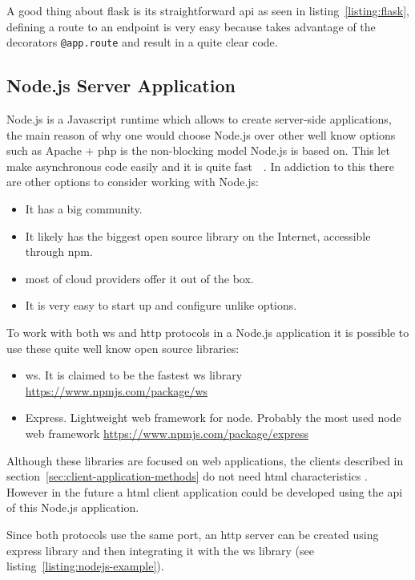 \documentclass[hidelinks,11pt,a4paper,oneside,article]{memoir}
\begin{document}
A good thing about flask is its straightforward \gls{api} as seen in listing~\ref{listing:flask}, defining a route to an endpoint is very easy because takes advantage of the decorators \texttt{@app.route} and result in a quite clear code.

\subsection{Node.js Server Application}
Node.js is a Javascript runtime which allows to create server-side applications, the main reason of why one would choose Node.js over other well know options such as Apache + \gls{php} is the non-blocking model Node.js is based on. This let make asynchronous code easily and it is quite fast~\cite[p.12]{nodejs}~\cite{nodeblocking}.
In addiction to this there are other options to consider working with Node.js:
\begin{itemize}
    \item It has a big community.
    \item It likely has the biggest open source library on the Internet, accessible through \gls{npm}.
    \item most of cloud providers offer it out of the box.
    \item It is very easy to start up and configure unlike options.
\end{itemize}
To work with both \gls{ws} and \gls{http} protocols in a Node.js application it is possible to use these quite well know open source libraries:

\begin{itemize}
    \item ws. It is claimed to be the fastest \gls{ws} library \url{https://www.npmjs.com/package/ws}
    \item Express. Lightweight web framework for node. Probably the most used node web framework \url{https://www.npmjs.com/package/express}
\end{itemize}
Although these libraries are focused on web applications, the clients described in section~\ref{sec:client-application-methods} do not need \gls{html} characteristics . However in the future a \gls{html} client application could be developed using the \gls{api} of this Node.js application.

Since both protocols use the same port, an \gls{http} server can be created using express library and then integrating it with the \gls{ws} library (see listing~\ref{listing:nodejs-example}).
\end{document}
